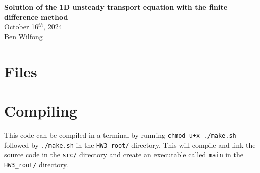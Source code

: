 \documentclass[reqno, 12pt]{amsart}
\def\name{Ben Wilfong} %
\def\ID{bwilfong3} %
\begin{document}
	\noindent
	\thispagestyle{firststyle}

    \begin{center}
        \LARGE{\textbf{Solution of the 1D unsteady transport equation with the finite difference method}} \\
        \Large{October 16$^{th}$, 2024} \\
        \large{Ben Wilfong}
    \end{center}
    \section*{Files}
    \section*{Compiling}
    \noindent This code can be compiled in a terminal by running \texttt{chmod u+x ./make.sh} followed by \texttt{./make.sh} in the \texttt{HW3\_root/} directory.
    This will compile and link the source code in the \texttt{src/} directory and create an executable called \texttt{main} in the \texttt{HW3\_root/} directory.
\end{document}
